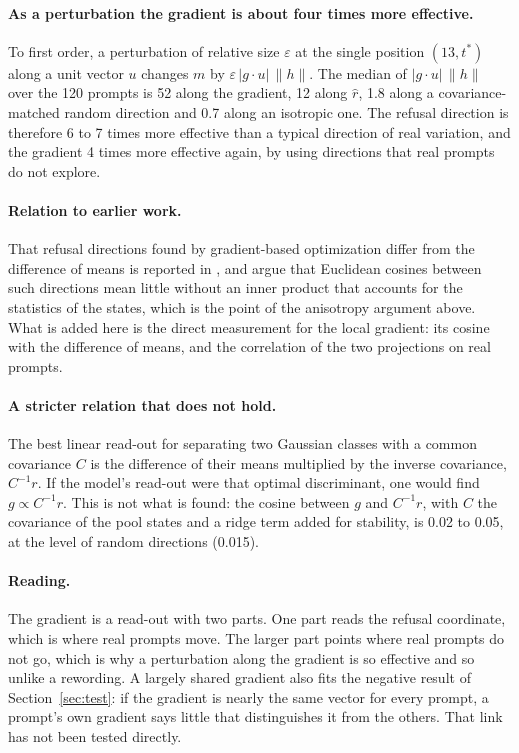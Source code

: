 \documentclass[11pt]{article}
\begin{document}
\paragraph{As a perturbation the gradient is about four times more effective.} To first order, a perturbation of relative size $\varepsilon$ at the single position $(13,t^*)$ along a unit vector $u$ changes $m$ by $\varepsilon\,|g\cdot u|\,\lVert h\rVert$. The median of $|g\cdot u|\,\lVert h\rVert$ over the 120 prompts is 52 along the gradient, 12 along $\hat r$, 1.8 along a covariance-matched random direction and 0.7 along an isotropic one. The refusal direction is therefore 6 to 7 times more effective than a typical direction of real variation, and the gradient 4 times more effective again, by using directions that real prompts do not explore.

\paragraph{Relation to earlier work.} That refusal directions found by gradient-based optimization differ from the difference of means is reported in \cite{wollschlager}, and \cite{park} argue that Euclidean cosines between such directions mean little without an inner product that accounts for the statistics of the states, which is the point of the anisotropy argument above. What is added here is the direct measurement for the local gradient: its cosine with the difference of means, and the correlation of the two projections on real prompts.

\paragraph{A stricter relation that does not hold.} The best linear read-out for separating two Gaussian classes with a common covariance $C$ is the difference of their means multiplied by the inverse covariance, $C^{-1}r$. If the model's read-out were that optimal discriminant, one would find $g\propto C^{-1}r$. This is not what is found: the cosine between $g$ and $C^{-1}r$, with $C$ the covariance of the pool states and a ridge term added for stability, is 0.02 to 0.05, at the level of random directions (0.015).

\paragraph{Reading.} The gradient is a read-out with two parts. One part reads the refusal coordinate, which is where real prompts move. The larger part points where real prompts do not go, which is why a perturbation along the gradient is so effective and so unlike a rewording. A largely shared gradient also fits the negative result of Section~\ref{sec:test}: if the gradient is nearly the same vector for every prompt, a prompt's own gradient says little that distinguishes it from the others. That link has not been tested directly.
\end{document}
